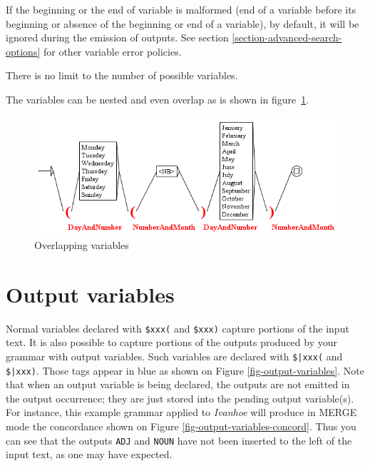 \bigskip
\noindent If the beginning or the end of variable is malformed (end of a variable before
its beginning or absence of the beginning or end of a variable), by default, it
will be ignored during the emission of outputs. See section
\ref{section-advanced-search-options} for other variable error policies.

\bigskip
\noindent There is no limit to the number of possible variables.

\bigskip
\noindent The variables can be nested and even overlap as is shown in
figure~\ref{fig-overlapping-variables}.

\begin{figure}[!ht]
\begin{center}
\includegraphics[width=15cm]{resources/img/fig6-29.png}
\caption{Overlapping variables\label{fig-overlapping-variables}}
\end{center}
\end{figure}

\clearpage




\section{Output variables}
Normal variables declared with \verb+$xxx(+ and \verb+$xxx)+ capture portions of the input text. It
is also possible to capture portions of the outputs produced by your grammar with output variables.
Such variables are declared with \verb+$|xxx(+ and \verb+$|xxx)+. Those tags appear in blue as shown 
on Figure \ref{fig-output-variables}. Note that when an output variable is being declared, the outputs
are not emitted in the output occurrence; they are just stored into the pending output variable(s). For
instance, this example grammar applied to \textit{Ivanhoe} will produce in MERGE mode the concordance 
shown on Figure \ref{fig-output-variables-concord}. Thus you can see that the outputs \verb+ADJ+ and 
\verb+NOUN+ have not been inserted to the left of the input text, as one may have expected.

